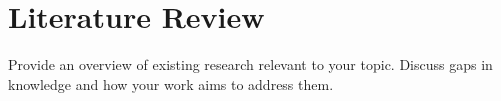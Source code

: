 \chapter{Literature Review}

Provide an overview of existing research relevant to your topic. Discuss gaps in knowledge and how your work aims to address them.
